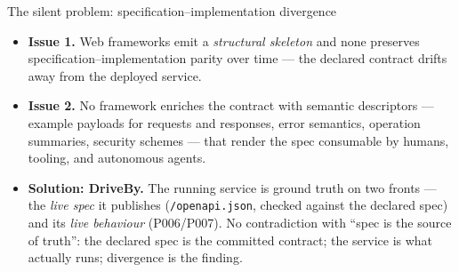 \documentclass[11pt,aspectratio=169]{beamer}
\begin{document}
\begin{frame}{The silent problem: specification--implementation divergence}
\begin{center}
\end{center}

\vspace{-0.4em}
\scriptsize
\begin{itemize}\setlength\itemsep{0.2em}
\item \textbf{\textcolor{sdtred!70!black}{Issue 1.}} Web frameworks emit a
  \emph{structural skeleton} and \alert{none preserves specification--implementation
  parity over time} --- the declared contract drifts away from the deployed service.
\item \textbf{\textcolor{sdtred!70!black}{Issue 2.}} No framework \alert{enriches the
  contract} with semantic descriptors --- example payloads for requests and responses,
  error semantics, operation summaries, security schemes --- that render the spec
  consumable by humans, tooling, and autonomous agents.
\item \textbf{\textcolor{sdtgreen}{Solution: DriveBy.}} The running service is ground
  truth on two fronts --- the \emph{live spec} it publishes (\texttt{/openapi.json},
  checked against the declared spec) and its \emph{live behaviour} (P006/P007).
  \alert{No contradiction with ``spec is the source of truth'':} the declared spec is
  the committed contract; the service is what actually runs; divergence is the finding.
\end{itemize}

\end{frame}
\end{document}

